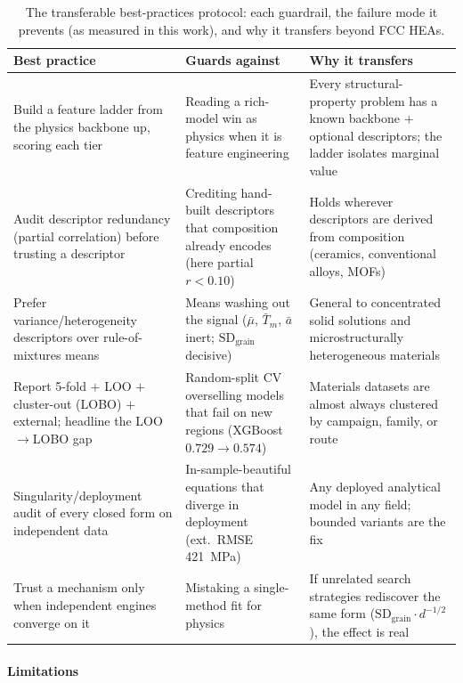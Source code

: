 \documentclass[5p,times,twocolumn]{elsarticle}
\begin{document}
\begin{table}[t]
\centering
\caption{The transferable best-practices protocol: each guardrail, the failure mode it prevents (as measured in this work), and why it transfers beyond FCC HEAs.}
\label{tab:protocol}
\small
\setlength{\tabcolsep}{5pt}
\begin{tabularx}{\textwidth}{@{}>{\raggedright\arraybackslash}p{4.4cm}>{\raggedright\arraybackslash}p{4.8cm}>{\raggedright\arraybackslash}X@{}}
\toprule
Best practice & Guards against & Why it transfers \\
\midrule
Build a feature ladder from the physics backbone up, scoring each tier & Reading a rich-model win as physics when it is feature engineering & Every structural-property problem has a known backbone $+$ optional descriptors; the ladder isolates marginal value \\
Audit descriptor redundancy (partial correlation) before trusting a descriptor & Crediting hand-built descriptors that composition already encodes (here partial $r < 0.10$) & Holds wherever descriptors are derived from composition (ceramics, conventional alloys, MOFs) \\
Prefer variance/heterogeneity descriptors over rule-of-mixtures means & Means washing out the signal ($\bar{\mu}$, $\bar{T}_m$, $\bar{a}$ inert; $\text{SD}_\text{grain}$ decisive) & General to concentrated solid solutions and microstructurally heterogeneous materials \\
Report 5-fold $+$ LOO $+$ cluster-out (LOBO) $+$ external; headline the LOO$\to$LOBO gap & Random-split CV overselling models that fail on new regions (XGBoost $0.729 \to 0.574$) & Materials datasets are almost always clustered by campaign, family, or route \\
Singularity/deployment audit of every closed form on independent data & In-sample-beautiful equations that diverge in deployment (ext.\ RMSE 421~\si{MPa}) & Any deployed analytical model in any field; bounded variants are the fix \\
Trust a mechanism only when independent engines converge on it & Mistaking a single-method fit for physics & If unrelated search strategies rediscover the same form ($\text{SD}_\text{grain}\cdot d^{-1/2}$), the effect is real \\
\bottomrule
\end{tabularx}
\end{table}

\paragraph{Limitations}
\label{sec:limitations}
\end{document}
